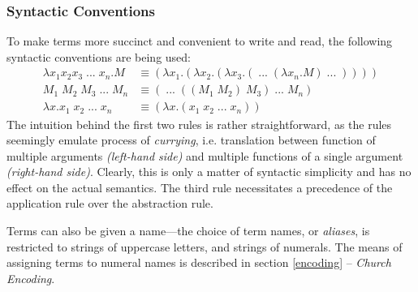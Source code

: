 \documentclass[a4paper,10pt]{article}
\begin{document}
\subsubsection{Syntactic Conventions}
To make terms more succinct and convenient to write and read, the 
following syntactic conventions are being used:
\begin{align*}
	\lambda x_1 x_2 x_3\;...\;x_n.M &\equiv (\lambda x_1.(\lambda x_2.(\lambda x_3.(\;...\;(\lambda x_n.M)\;...\;))))\\
	M_1\;M_2\;M_3\;...\;M_n &\equiv (\;...\;((M_1\;M_2)\;M_3)\;...\;M_n)\\
	\lambda x.x_1\;x_2\;...\;x_n &\equiv (\lambda x.(x_1\;x_2\;...\;x_n))
\end{align*}
The intuition behind the first two rules is rather straightforward, as the rules
seemingly emulate process of \textit{currying}, i.e.
translation between function of multiple arguments \textit{(left-hand side)} and multiple
functions of a single argument \textit{(right-hand side)}. Clearly, this is only
a matter of syntactic simplicity and has no effect on the actual semantics.
The third rule necessitates a precedence of the application rule over the abstraction rule.

Terms can also be given a name---the choice of term names, or \textit{aliases}, is restricted to 
strings of uppercase letters, and strings of numerals.
The means of assigning terms to numeral names is described in section \ref{encoding} -- \textit{Church Encoding}.
\end{document}
